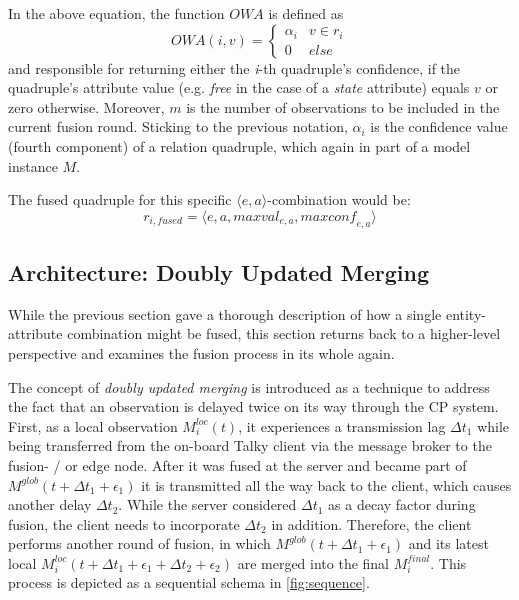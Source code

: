 In the above equation, the function $\textit{OWA}$ is defined as
$$
\textit{OWA}(i, v) = 
	\begin{cases}
	\alpha_i & v \in r_i \\
	0 & else
	\end{cases}
$$
and responsible for returning either the \textit{i}-th quadruple's confidence, if the quadruple's attribute value (e.g. \textit{free} in the case of a \textit{state} attribute) equals $v$ or zero otherwise. Moreover, $m$ is the number of observations to be included in the current fusion round. Sticking to the previous notation, $\alpha_i$ is the confidence value (fourth component) of a relation quadruple, which again in part of a model instance $M$.

The fused quadruple for this specific $\langle e, a \rangle$-combination would be:
$$ r_{i,fused} = \langle e, a, \textit{maxval}_{e,a}, \textit{maxconf}_{e,a} \rangle $$

\subsection{Architecture: Doubly Updated Merging}
\label{subsec:concept_design:fusion_architecture}

While the previous section gave a thorough description of how a single entity-attribute combination might be fused, this section returns back to a higher-level perspective and examines the fusion process in its whole again.

The concept of \textit{doubly updated merging} is introduced as a technique to address the fact that an observation is delayed twice on its way through the CP system. First, as a local observation $M^{loc}_i(t)$, it experiences a transmission lag $\Delta t_1$ while being transferred from the on-board Talky client via the message broker to the fusion- / or edge node. After it was fused at the server and became part of $M^{glob}(t+\Delta t_1+\epsilon_1)$ it is transmitted all the way back to the client, which causes another delay $\Delta t_2$. While the server considered $\Delta t_1$ as a decay factor during fusion, the client needs to incorporate $\Delta t_2$ in addition. Therefore, the client performs another round of fusion, in which $M^{glob}(t+\Delta t_1+\epsilon_1)$ and its latest local $M^{loc}_i(t+\Delta t_1+\epsilon_1+\Delta t_2+\epsilon_2)$ are merged into the final $M^{final}_i$. This process is depicted as a sequential schema in \cref{fig:sequence}.

